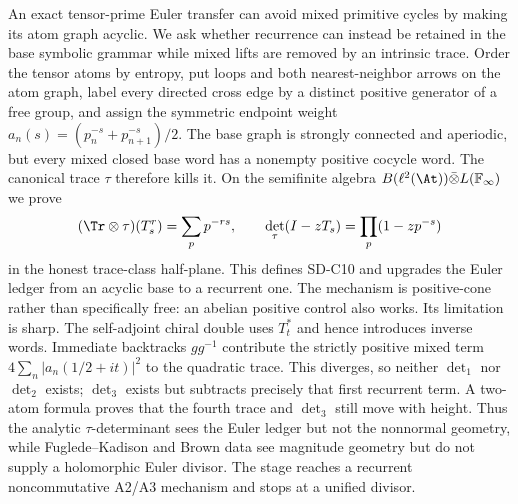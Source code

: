 An exact tensor-prime Euler transfer can avoid mixed primitive cycles by
making its atom graph acyclic.  We ask whether recurrence can instead be
retained in the base symbolic grammar while mixed lifts are removed by an
intrinsic trace.  Order the tensor atoms by entropy, put loops and both
nearest-neighbor arrows on the atom graph, label every directed cross edge
by a distinct positive generator of a free group, and assign the symmetric
endpoint weight
$a_n(s)=(p_n^{-s}+p_{n+1}^{-s})/2$.  The base graph is strongly connected
and aperiodic, but every mixed closed base word has a nonempty positive
cocycle word.  The canonical trace $\tau$ therefore kills it.  On the
semifinite algebra
$B(\ell^2(\At))\bar\otimes L(\mathbb F_\infty)$ we prove
\[
 (\Tr\otimes\tau)(T_s^r)=\sum_pp^{-rs},\qquad
 \det_\tau(I-zT_s)=\prod_p(1-zp^{-s})
\]
in the honest trace-class half-plane.  This defines SD-C10 and upgrades the
Euler ledger from an acyclic base to a recurrent one.  The mechanism is
positive-cone rather than specifically free: an abelian positive control
also works.  Its limitation is sharp.  The self-adjoint chiral double uses
$T_t^*$ and hence introduces inverse words.  Immediate backtracks
$gg^{-1}$ contribute the strictly positive mixed term
$4\sum_n|a_n(1/2+it)|^2$ to the quadratic trace.  This diverges, so neither
$\det_1$ nor $\det_2$ exists; $\det_3$ exists but subtracts precisely that
first recurrent term.  A two-atom formula proves that the fourth trace and
$\det_3$ still move with height.  Thus the analytic $\tau$-determinant sees
the Euler ledger but not the nonnormal geometry, while Fuglede--Kadison and
Brown data see magnitude geometry but do not supply a holomorphic Euler
divisor.  The stage reaches a recurrent noncommutative A2/A3 mechanism and
stops at a unified divisor.
